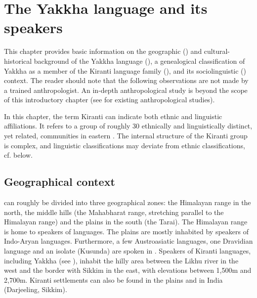 ﻿\chapter{The Yakkha language and its speakers}\label{languageintro}
This chapter provides basic information on the geographic () and cultural-historical  background of the Yakkha language (), a genealogical classification of Yakkha as a member of the Kiranti language family (), and its sociolinguistic () context. The reader should note that the  following observations are not made by a trained anthropologist. An in-depth anthropological study is beyond the scope of this introductory chapter (see  for existing anthropological studies). 

In this chapter, the term  Kiranti can indicate both ethnic and linguistic affiliations. It refers to a group of roughly 30 ethnically and linguistically distinct, yet related, communities in eastern . The internal structure of the Kiranti group is complex, and linguistic classifications may deviate from ethnic classifications, cf.  below.

\section{Geographical context}\label{geogr}

 can roughly be divided into three geographical zones: the Himalayan range in the north, the middle hills (the Mahabharat range, stretching parallel to the Himalayan range) and the plains in the south (the Tarai). The Himalayan range is home to speakers of  languages. The plains are mostly inhabited by speakers of Indo-Aryan languages. Furthermore, a few Austroasiatic languages, one Dravidian language and an isolate (Kusunda) are spoken in . Speakers of Kiranti languages, including Yakkha (see ), inhabit the hilly area between the Likhu river in the west and the border with Sikkim in the east, with elevations between 1,500m and 2,700m. Kiranti  settlements can also be found in the plains and in India (Darjeeling, Sikkim). 


